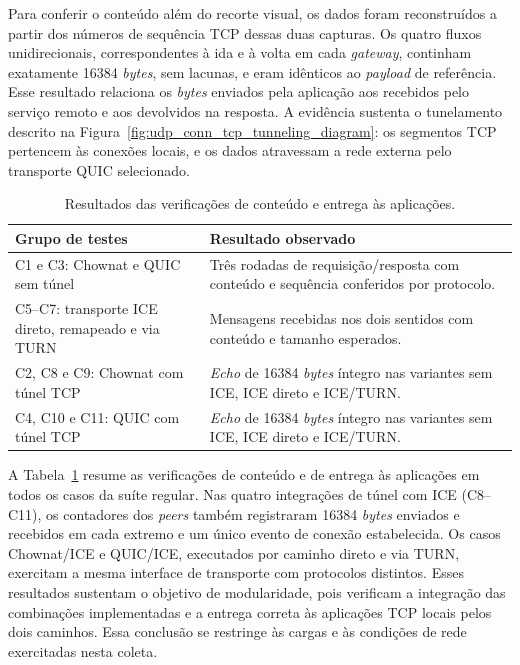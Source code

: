 Para conferir o conteúdo além do recorte visual, os dados foram reconstruídos a partir dos números de sequência TCP dessas duas capturas. Os quatro fluxos unidirecionais, correspondentes à ida e à volta em cada \textit{gateway}, continham exatamente 16384 \textit{bytes}, sem lacunas, e eram idênticos ao \textit{payload} de referência. Esse resultado relaciona os \textit{bytes} enviados pela aplicação aos recebidos pelo serviço remoto e aos devolvidos na resposta. A evidência sustenta o tunelamento descrito na Figura~\ref{fig:udp_conn_tcp_tunneling_diagram}: os segmentos TCP pertencem às conexões locais, e os dados atravessam a rede externa pelo transporte QUIC selecionado.

\begin{table}[htbp]
    \centering
    \caption{Resultados das verificações de conteúdo e entrega às aplicações.}
    \label{tab:functional_transfer}
    \small
    \begin{tabular}{@{}p{}p{}@{}}
        \toprule
        \textbf{Grupo de testes} & \textbf{Resultado observado} \\
        \midrule
        C1 e C3: Chownat e QUIC sem túnel & Três rodadas de requisição/resposta com conteúdo e sequência conferidos por protocolo. \\
        C5--C7: transporte ICE direto, remapeado e via TURN & Mensagens recebidas nos dois sentidos com conteúdo e tamanho esperados. \\
        C2, C8 e C9: Chownat com túnel TCP & \textit{Echo} de 16384 \textit{bytes} íntegro nas variantes sem ICE, ICE direto e ICE/TURN. \\
        C4, C10 e C11: QUIC com túnel TCP & \textit{Echo} de 16384 \textit{bytes} íntegro nas variantes sem ICE, ICE direto e ICE/TURN. \\
        \bottomrule
    \end{tabular}
\end{table}

A Tabela~\ref{tab:functional_transfer} resume as verificações de conteúdo e de entrega às aplicações em todos os casos da suíte regular. Nas quatro integrações de túnel com ICE (C8--C11), os contadores dos \textit{peers} também registraram 16384 \textit{bytes} enviados e recebidos em cada extremo e um único evento de conexão estabelecida. Os casos Chownat/ICE e QUIC/ICE, executados por caminho direto e via TURN, exercitam a mesma interface de transporte com protocolos distintos. Esses resultados sustentam o objetivo de modularidade, pois verificam a integração das combinações implementadas e a entrega correta às aplicações TCP locais pelos dois caminhos. Essa conclusão se restringe às cargas e às condições de rede exercitadas nesta coleta.


